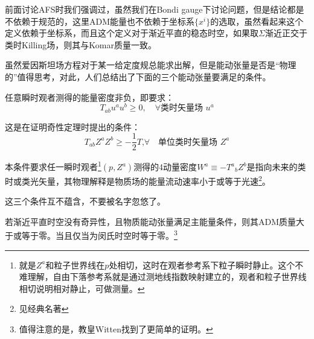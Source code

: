 前面讨论AFS时我们强调过，虽然我们在Bondi gauge下讨论问题，但是结论都是不依赖于规范的，这里ADM能量也不依赖于坐标系$\{x^i\}$的选取，虽然看起来这个定义依赖于坐标系，而且这个定义对于渐近平直的稳态时空，如果取$\Sigma$渐近正交于类时Killing场，则其与Komar质量一致。

虽然爱因斯坦场方程对于某一给定度规总能求出解，但是能动张量是否是“物理的”值得思考，对此，人们总结出了下面的三个能动张量要满足的条件。
\begin{definition}[弱能量条件]
	任意瞬时观者测得的能量密度非负，即要求：
	\begin{equation}
		T_{ab}u^au^b\geq 0,\quad\forall\text{类时矢量场 }u^a
	\end{equation}
\end{definition}

\begin{definition}[强能量条件]
	这是在证明奇性定理时提出的条件：
	\begin{equation}
		T_{ab}Z^aZ^b\geq-\frac12T\text{,}\forall\quad \text{单位类时矢量场 }Z^a
	\end{equation}
\end{definition}
\begin{definition}[主能量条件]
	本条件要求任一瞬时观者\footnote{就是$Z^a$和粒子世界线在$p$处相切，这时在观者参考系下粒子瞬时静止。这个不难理解，自由下落参考系就是通过测地线指数映射建立的，观者和粒子世界线相切说明相对静止，可做测量。}$(p,Z^a)$测得的4动量密度$W^a\equiv-{T^a}_bZ^b$是指向未来的类时或类光矢量，其物理解释是物质场的能量流动速率小于或等于光速\footnote{见经典名著\cite{Hawking:1973uf}}。
\end{definition}
这三个条件互不蕴含，不要被名字忽悠了。
\begin{theorem}
	若渐近平直时空没有奇异性，且物质能动张量满足主能量条件，则其ADM质量大于或等于零。当且仅当为闵氏时空时等于零。\footnote{值得注意的是，教皇Witten找到了更简单的证明\cite{Witten:1981mf,Parker:1981uy}。}
\end{theorem}

